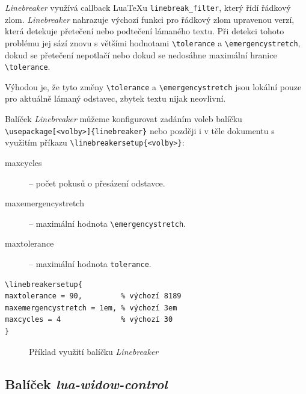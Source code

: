 \documentclass{csbulletin}
\newcommand\balicek[1]{\textit{#1}}
\begin{document}
\balicek{Linebreaker} využívá callback Lua\TeX u \verb|linebreak_filter|, který řídí řádkový zlom.
\balicek{Linebreaker} nahrazuje výchozí funkci pro řádkový zlom upravenou
verzí, která detekuje přetečení nebo podtečení lámaného textu. Při detekci
tohoto problému jej sází znovu s většími hodnotami \verb|\tolerance| a
\verb|\emergencystretch|, dokud se přetečení nepotlačí nebo dokud se nedosáhne
maximální hranice \verb|\tolerance|.

Výhodou je, že tyto změny \verb|\tolerance| a \verb|\emergencystretch| jsou lokální pouze 
pro aktuálně lámaný odstavec, zbytek textu nijak neovlivní. 


Balíček \balicek{Linebreaker} můžeme konfigurovat zadáním voleb balíčku
\texttt{\textbackslash use}\discretionary{-}{}{}\texttt{package[<volby>]\{linebreaker\}} nebo později i v těle dokumentu s využitím příkazu
\texttt{\textbackslash linebreakersetup\{<volby>\}}:
\medskip

  \begin{description}
    \item[maxcycles] – počet pokusů o přesázení odstavce.
    \item[maxemergencystretch] – maximální hodnota \verb|\emergencystretch|.
    \item[maxtolerance] – maximální hodnota \verb|tolerance|.
  \end{description}

\medskip

\begin{verbatim}
\linebreakersetup{
maxtolerance = 90,         % výchozí 8189
maxemergencystretch = 1em, % výchozí 3em
maxcycles = 4              % výchozí 30
}
\end{verbatim}

\begin{figure}[b!]
  \caption{Příklad využití balíčku \balicek{Linebreaker}}
  \label{fig:linebreaker}
\end{figure}

\subsection{Balíček \balicek{lua-widow-control}}
\end{document}
